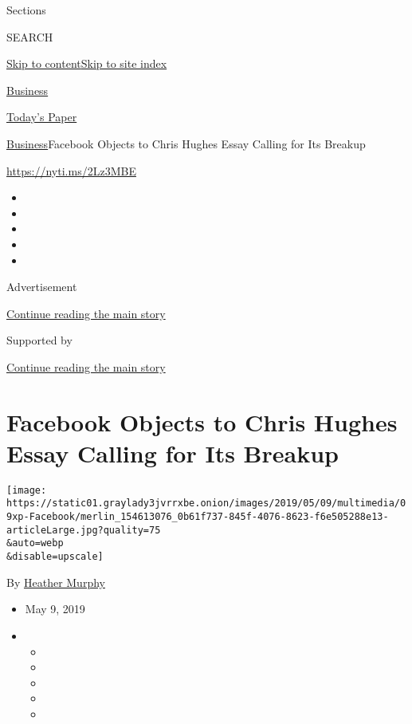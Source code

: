 Sections

SEARCH

\protect\hyperlink{site-content}{Skip to
content}\protect\hyperlink{site-index}{Skip to site index}

\href{https://www.nytimes3xbfgragh.onion/section/business}{Business}

\href{https://myaccount.nytimes3xbfgragh.onion/auth/login?response_type=cookie\&client_id=vi}{}

\href{https://www.nytimes3xbfgragh.onion/section/todayspaper}{Today's
Paper}

\href{/section/business}{Business}\textbar{}Facebook Objects to Chris
Hughes Essay Calling for Its Breakup

\url{https://nyti.ms/2Lz3MBE}

\begin{itemize}
\item
\item
\item
\item
\item
\end{itemize}

Advertisement

\protect\hyperlink{after-top}{Continue reading the main story}

Supported by

\protect\hyperlink{after-sponsor}{Continue reading the main story}

\hypertarget{facebook-objects-to-chris-hughes-essay-calling-for-its-breakup}{%
\section{Facebook Objects to Chris Hughes Essay Calling for Its
Breakup}\label{facebook-objects-to-chris-hughes-essay-calling-for-its-breakup}}

\texttt{[image: https://static01.graylady3jvrrxbe.onion/images/2019/05/09/multimedia/09xp-Facebook/merlin\_154613076\_0b61f737-845f-4076-8623-f6e505288e13-articleLarge.jpg?quality=75\\\&auto=webp\\\&disable=upscale]}

By \href{https://www.nytimes3xbfgragh.onion/by/heather-murphy}{Heather
Murphy}

\begin{itemize}
\item
  May 9, 2019
\item
  \begin{itemize}
  \item
  \item
  \item
  \item
  \item
  \end{itemize}
\end{itemize}

